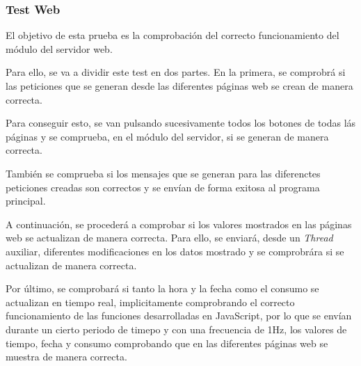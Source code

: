 \subsubsection{Test Web}

El objetivo de esta prueba es la comprobación del correcto funcionamiento del módulo del servidor web.

Para ello, se va a dividir este test en dos partes. En la primera, se comprobrá si las peticiones que se generan desde las diferentes páginas web se crean de manera correcta.

Para conseguir esto, se van pulsando sucesivamente todos los botones de todas lás páginas y se comprueba, en el módulo del servidor, si se generan de manera correcta.

También se comprueba si los mensajes que se generan para las diferenctes peticiones creadas son correctos y se envían de forma exitosa al programa principal.

A continuación, se procederá a comprobar si los valores mostrados en las páginas web se actualizan de manera correcta. Para ello, se enviará, desde un \textit{Thread} auxiliar, diferentes modificaciones en los datos mostrado y se comprobrára si se actualizan de manera correcta.

Por último, se comprobará si tanto la hora y la fecha como el consumo se actualizan en tiempo real, implicitamente comprobrando el correcto funcionamiento de las funciones desarrolladas en JavaScript, por lo que se envían durante un cierto periodo de timepo y con una frecuencia de 1Hz, los valores de tiempo, fecha y consumo comprobando que en las diferentes páginas web se muestra de manera correcta.